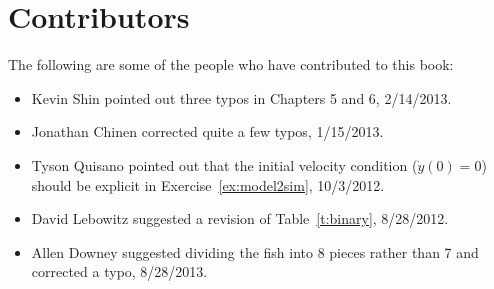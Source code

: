 \chapter{Contributors}
The following are some of the people who have contributed to this book:
\begin{itemize}
\item Kevin Shin pointed out three typos in Chapters 5 and 6, 2/14/2013.
\item Jonathan Chinen corrected quite a few typos, 1/15/2013.
\item Tyson Quisano pointed out that the initial velocity condition ($\dot{y}(0)=0$) should be explicit in Exercise~\ref{ex:model2sim}, 10/3/2012.
\item David Lebowitz suggested a revision of Table~\ref{t:binary}, 8/28/2012.
\item Allen Downey suggested dividing the fish into 8 pieces rather than 7 and corrected a typo, 8/28/2013.
\end{itemize}

